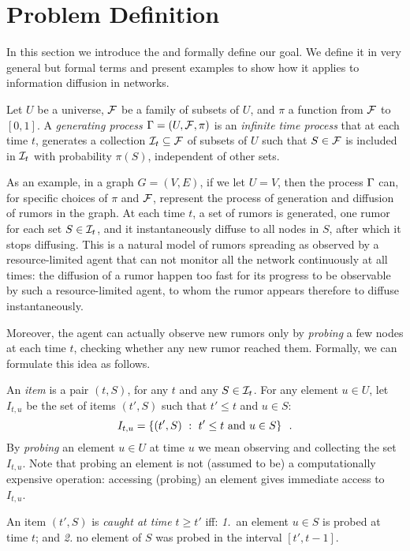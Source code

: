 \section{Problem Definition}\label{sec:prelims}
In this section we introduce the \probname and formally define our goal. We
define it in very general but formal terms and present examples to
show how it applies to information diffusion in networks.

\begin{definition}
Let $U$ be a universe, $\F$ be a family of subsets of $U$, and
$\pi$ a function from $\F$ to $[0,1]$. A \emph{generating process} $\sys = (U,
\F,\pi)$ is an \emph{infinite time process} that at each time $t$, generates a
collection $\S_t\subseteq\F$ of subsets of $U$ such that $S\in \F$ is included
in $\S_t$ with probability $\pi(S)$, independent of other sets. 
\end{definition}

As an example, in a graph $G=(V,E)$, if we let $U=V$, then the process $\sys$
can, for specific choices of $\pi$ and $\F$, represent the process of
generation and diffusion of rumors in the graph. At each time $t$, a set of
rumors is generated, one rumor for each set $S\in\S_t$, and it instantaneously
diffuse to all nodes in $S$, after which it stops diffusing. This is a natural
model of rumors spreading as observed by a resource-limited agent that can not
monitor all the network continuously at all times: the diffusion of a rumor
happen too fast for its progress to be observable by such a resource-limited
agent, to whom the rumor appears therefore to diffuse instantaneously. 

Moreover, the agent can actually observe new rumors only by \emph{probing} a few
nodes at each time $t$, checking whether any new rumor reached them. Formally,
we can formulate this idea as follows.

An \emph{item} is a pair $(t,S)$, for any $t$ and any $S\in\S_t$. For any
element $u\in U$, let $I_{t,u}$ be the set of items $(t',S)$ such that $t'\le t$
and $u\in S$:
\[
	I_{t,u}=\set{(t',S) ~:~ t'\le t \mbox{ and } u\in S}\enspace.
\]
By \emph{probing} an element $u\in U$ at time $u$ we mean observing and
collecting the set $I_{t,u}$. Note that probing an element is not (assumed to
be) a computationally expensive operation: accessing (probing) an element gives
immediate access to $I_{t,u}$.

An item $(t',S)$ is \emph{caught at time $t\geq t'$} iff: \emph{1.}~an element
$u\in S$ is probed at time $t$; and \emph{2.} no element of $S$ was probed in
the interval $[t',t-1]$.

